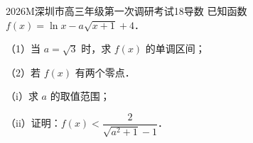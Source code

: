 
\begin{problem}{2026}{M}{深圳市高三年级第一次调研考试}{18}{导数}
已知函数 $f(x)=\ln x-a\sqrt{x+1}+4$．

（1）当 $a=\sqrt{3}$ 时，求 $f(x)$ 的单调区间；

（2）若 $f(x)$ 有两个零点．

（i）求 $a$ 的取值范围；

（ii）证明：$f(x)<\dfrac{2}{\sqrt{a^2+1}-1}$．
\end{problem}